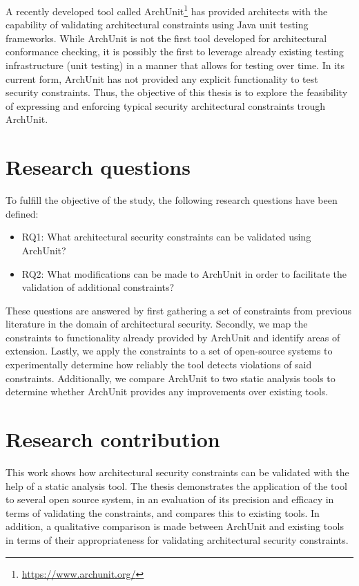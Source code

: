 A recently developed tool called ArchUnit\footnote{\url{https://www.archunit.org/}} has provided architects with the capability of validating architectural constraints using Java unit testing frameworks. While ArchUnit is not the first tool developed for architectural conformance checking, it is possibly the first to leverage already existing testing infrastructure (unit testing) in a manner that allows for testing over time. In its current form, ArchUnit has not provided any explicit functionality to test security constraints. Thus, the objective of this thesis is to explore the feasibility of expressing and enforcing typical security architectural constraints trough ArchUnit.

\section{Research questions}
To fulfill the objective of the study, the following research questions have been defined:

\begin{itemize}
    \item RQ1: What architectural security constraints can be validated using ArchUnit?
    \item RQ2: What modifications can be made to ArchUnit in order to facilitate the validation of additional constraints?
\end{itemize}

These questions are answered by first gathering a set of constraints from previous literature in the domain of architectural security. Secondly, we map the constraints to functionality already provided by ArchUnit and identify areas of extension. Lastly, we apply the constraints to a set of open-source systems to experimentally determine how reliably the tool detects violations of said constraints. Additionally, we compare ArchUnit to two static analysis tools to determine whether ArchUnit provides any improvements over existing tools. 

\section{Research contribution}
This work shows how architectural security constraints can be validated with the help of a static analysis tool. The thesis demonstrates the application of the tool to several open source system, in an evaluation of its precision and efficacy in terms of validating the constraints, and compares this to existing tools. In addition, a qualitative comparison is made between ArchUnit and existing tools in terms of their appropriateness for validating architectural security constraints.

